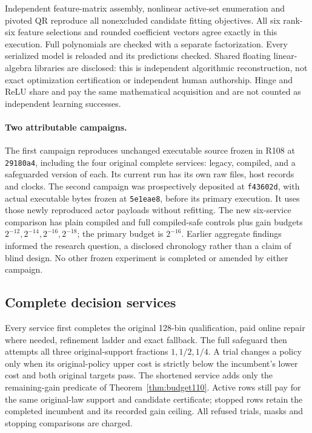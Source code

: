 Independent feature-matrix assembly, nonlinear active-set enumeration and pivoted QR reproduce all nonexcluded candidate fitting objectives. All six rank-six feature selections and rounded coefficient vectors agree exactly in this execution. Full polynomials are checked with a separate factorization. Every serialized model is reloaded and its predictions checked. Shared floating linear-algebra libraries are disclosed: this is independent algorithmic reconstruction, not exact optimization certification or independent human authorship. Hinge and ReLU share and pay the same mathematical acquisition and are not counted as independent learning successes.

\paragraph{Two attributable campaigns.}
The first campaign reproduces unchanged executable source frozen in R108 at \texttt{29180a4}, including the four original complete services: legacy, compiled, and a safeguarded version of each. Its current run has its own raw files, host records and clocks. The second campaign was prospectively deposited at \texttt{f43602d}, with actual executable bytes frozen at \texttt{5e1eae8}, before its primary execution. It uses those newly reproduced actor payloads without refitting. The new six-service comparison has plain compiled and full compiled-safe controls plus gain budgets $2^{-12},2^{-14},2^{-16},2^{-18}$; the primary budget is $2^{-16}$. Earlier aggregate findings informed the research question, a disclosed chronology rather than a claim of blind design. No other frozen experiment is completed or amended by either campaign.

\subsection{Complete decision services}
Every service first completes the original 128-bin qualification, paid online repair where needed, refinement ladder and exact fallback. The full safeguard then attempts all three original-support fractions $1,1/2,1/4$. A trial changes a policy only when its original-policy upper cost is strictly below the incumbent's lower cost and both original targets pass. The shortened service adds only the remaining-gain predicate of Theorem~\ref{thm:budget110}. Active rows still pay for the same original-law support and candidate certificate; stopped rows retain the completed incumbent and its recorded gain ceiling. All refused trials, masks and stopping comparisons are charged.

